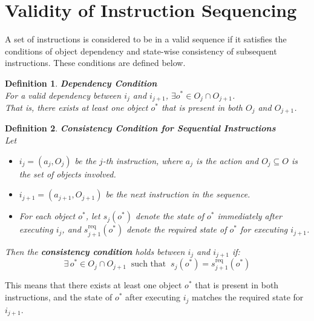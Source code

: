 \documentclass[a4paper,11pt]{lmcs}
\newtheorem{definition}{Definition}%
\begin{document}
\section{Validity of Instruction Sequencing}
\label{sec:validity}
A set of instructions is considered to be in a valid sequence if it satisfies the conditions of object dependency and state-wise  consistency of subsequent instructions. These conditions are defined below.
\begin{definition}
\textbf{Dependency Condition} \\
For a valid dependency between $ i_j $ and $ i_{j+1} $, $
\exists o^* \in O_j \cap O_{j+1}$. \\
That is, there exists at least one object \( o^* \) that is present in both \( O_j \) and \( O_{j+1} \).
\end{definition}
\begin{definition}
\textbf{Consistency Condition for Sequential Instructions}
\\
Let
\begin{itemize}
    \item $i_j = (a_j, O_j)$ be the $j$-th instruction, where $a_j$ is the action and $O_j \subseteq O$ is the set of objects involved.
    \item $i_{j+1} = (a_{j+1}, O_{j+1})$ be the next instruction in the sequence.
    \item For each object $o^*$, let $s_j(o^*)$ denote the state of $o^*$ immediately after executing $i_j$, and $s_{j+1}^{\mathrm{req}}(o^*)$ denote the required state of $o^*$ for executing $i_{j+1}$.
\end{itemize}

Then the \textbf{consistency condition} holds between $i_j$ and $i_{j+1}$ if:
\[
\exists\, o^* \in O_j \cap O_{j+1} \;\; \text{such that} \;\; s_j(o^*) = s_{j+1}^{\mathrm{req}}(o^*)
\]
\end{definition}
This means that there exists at least one object $o^*$ that is present in both instructions, and the state of $o^*$ after executing $i_j$ matches the required state for $i_{j+1}$.
\end{document}
